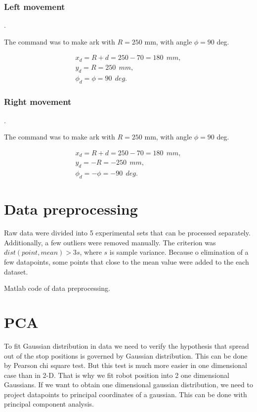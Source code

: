 \documentclass[a4paper, 12pt]{article}
\begin{document}
\subsubsection{Left movement}.

The command was to make ark with $R = 250$ mm, with angle $\phi = 90$ deg.

\medskip

$$
\begin{array}{l}
x_d = R + d = 250-70 = 180 ~~mm, \\
y_d = R = 250 ~~mm, \\
\phi_d = \phi = 90~~ deg.
\end{array}
$$

\subsubsection{Right movement}.

The command was to make ark with $R = 250$ mm, with angle $\phi = 90$ deg.

\medskip

$$
\begin{array}{l}
x_d = R + d = 250-70 = 180 ~~mm, \\
y_d = -R = -250 ~~mm, \\
\phi_d = -\phi = -90~~ deg.
\end{array}
$$


\section{Data preprocessing}
Raw data were divided into 5 experimental sets that can be processed separately. Additionally, a few outliers were removed manually. The criterion was $dist(point,mean)>3 s$, where $s$ is sample variance. Because o elimination of a few datapoints, some points that close to the mean value were added to the each dataset.

\medskip

Matlab code of data preprocessing.



\newpage

\section{PCA}
To fit Gaussian distribution in data we need to verify the hypothesis that spread out of the stop positions is governed by Gaussian distribution. This can be done by Pearson chi square test. But this test is much more easier in one dimensional case than in 2-D. That is why we fit robot position into 2 one dimensional Gaussians. If we want to obtain one dimensional gaussian distribution, we need to project datapoints to principal coordinates of a gaussian. This can be done with principal component analysis.
\end{document}
